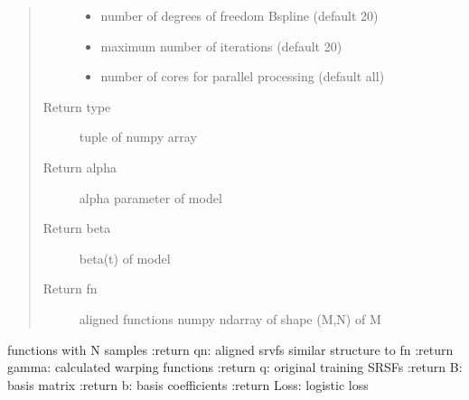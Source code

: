 \documentclass[letterpaper,10pt,english]{sphinxmanual}
\begin{document}
\begin{fulllineitems}
\begin{quote}
\begin{description}
\begin{itemize}
\item {} 
 \textendash{} number of degrees of freedom B\sphinxhyphen{}spline (default 20)

\item {} 
 \textendash{} maximum number of iterations (default 20)

\item {} 
 \textendash{} number of cores for parallel processing (default all)

\end{itemize}

\item[{Return type}] \leavevmode
tuple of numpy array

\item[{Return alpha}] \leavevmode
alpha parameter of model

\item[{Return beta}] \leavevmode
beta(t) of model

\item[{Return fn}] \leavevmode
aligned functions \sphinxhyphen{} numpy ndarray of shape (M,N) of M

\end{description}\end{quote}

functions with N samples
:return qn: aligned srvfs \sphinxhyphen{} similar structure to fn
:return gamma: calculated warping functions
:return q: original training SRSFs
:return B: basis matrix
:return b: basis coefficients
:return Loss: logistic loss

\end{fulllineitems}

\end{document}
